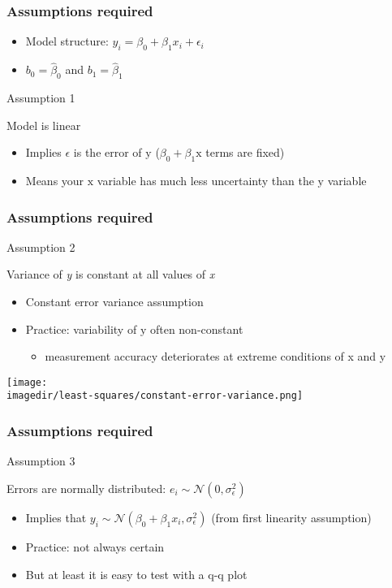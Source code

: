 \begin{frame}\frametitle{Assumptions required}
	\begin{itemize}
		\item	Model structure: $y_i = \beta_0 + \beta_1 x_i + \epsilon_i$ 
		\item	$b_0 = \hat{\beta}_0$ and $b_1= \hat{\beta}_1$ 
	\end{itemize}
	\begin{block}
		{Assumption 1} 
		\begin{center}
			Model is linear 
		\end{center}
	\end{block}
	\begin{itemize}
		\item	Implies $\epsilon$ is the error of $\mathrm{y}$ ($\beta_0 + \beta_1 \mathrm{x}$ terms are fixed) 
		\item	Means your $\mathrm{x}$ variable has much less uncertainty than the $\mathrm{y}$ variable 
	\end{itemize}
\end{frame}

\begin{frame}\frametitle{Assumptions required}
	\begin{block}
		{Assumption 2} 
		\begin{center}
			Variance of \emph{y} is constant at all values of \emph{x} 
		\end{center}
	\end{block}
	\begin{itemize}
		\item	Constant error variance assumption 
		\item	Practice: variability of $\mathrm{y}$ often non-constant 
		\begin{itemize}
			\item	measurement accuracy deteriorates at extreme conditions of x and y 
		\end{itemize}
	\end{itemize}
	\begin{center}
		\texttt{[image: \\imagedir/least-squares/constant-error-variance.png]}
	\end{center}
\end{frame}

\begin{frame}\frametitle{Assumptions required}
	\begin{block}
		{Assumption 3} 
		\begin{center}
			Errors are normally distributed: $e_i \sim \mathcal{N}(0, \sigma_\epsilon^2)$ 
		\end{center}
	\end{block}
	\begin{itemize}
		\item	Implies that $y_i \sim \mathcal{N}(\beta_0 + \beta_1x_i, \sigma_\epsilon^2)$ (from first linearity assumption) 
		\item	Practice: not always certain 
		\item	But at least it is easy to test with a q-q plot 
	\end{itemize}
\end{frame}

